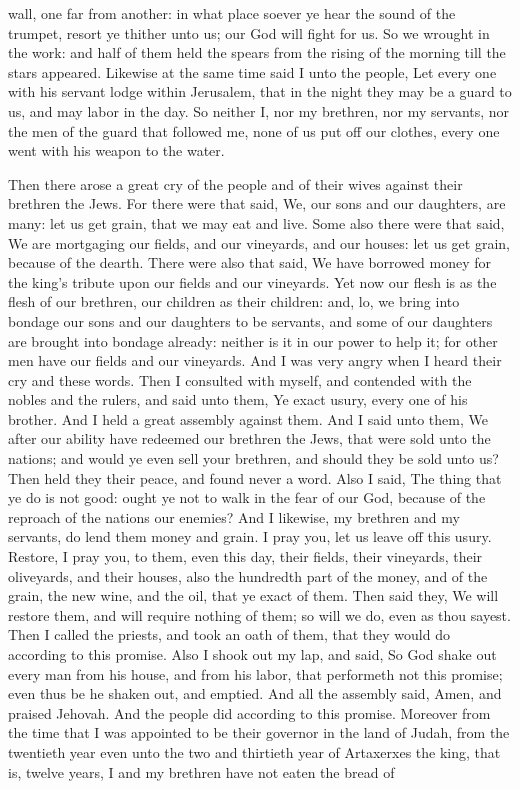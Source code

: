 wall, one far from another: in what place soever ye hear the sound of the trumpet, resort ye thither unto us; our God will fight for us.  So we wrought in the work: and half of them held the spears from the rising of the morning till the stars appeared. Likewise at the same time said I unto the people, Let every one with his servant lodge within Jerusalem, that in the night they may be a guard to us, and may labor in the day. So neither I, nor my brethren, nor my servants, nor the men of the guard that followed me, none of us put off our clothes, every one went with his weapon to the water. 

Then there arose a great cry of the people and of their wives against their brethren the Jews. For there were that said, We, our sons and our daughters, are many: let us get grain, that we may eat and live. Some also there were that said, We are mortgaging our fields, and our vineyards, and our houses: let us get grain, because of the dearth. There were also that said, We have borrowed money for the king’s tribute upon our fields and our vineyards. Yet now our flesh is as the flesh of our brethren, our children as their children: and, lo, we bring into bondage our sons and our daughters to be servants, and some of our daughters are brought into bondage already: neither is it in our power to help it; for other men have our fields and our vineyards.  And I was very angry when I heard their cry and these words. Then I consulted with myself, and contended with the nobles and the rulers, and said unto them, Ye exact usury, every one of his brother. And I held a great assembly against them. And I said unto them, We after our ability have redeemed our brethren the Jews, that were sold unto the nations; and would ye even sell your brethren, and should they be sold unto us? Then held they their peace, and found never a word. Also I said, The thing that ye do is not good: ought ye not to walk in the fear of our God, because of the reproach of the nations our enemies? And I likewise, my brethren and my servants, do lend them money and grain. I pray you, let us leave off this usury. Restore, I pray you, to them, even this day, their fields, their vineyards, their oliveyards, and their houses, also the hundredth part of the money, and of the grain, the new wine, and the oil, that ye exact of them. Then said they, We will restore them, and will require nothing of them; so will we do, even as thou sayest. Then I called the priests, and took an oath of them, that they would do according to this promise. Also I shook out my lap, and said, So God shake out every man from his house, and from his labor, that performeth not this promise; even thus be he shaken out, and emptied. And all the assembly said, Amen, and praised Jehovah. And the people did according to this promise.  Moreover from the time that I was appointed to be their governor in the land of Judah, from the twentieth year even unto the two and thirtieth year of Artaxerxes the king, that is, twelve years, I and my brethren have not eaten the bread of 
